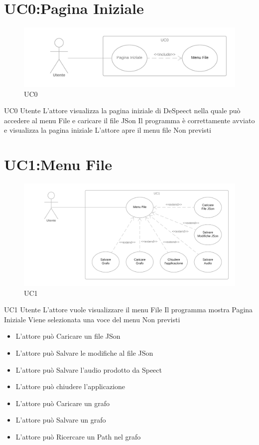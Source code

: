 \documentclass[../AnalisideiRequisiti.tex]{subfiles}
\begin{document}
	\section{UC0:Pagina Iniziale}
	\begin{figure}[H]
		\caption{UC0}
		\centering
		\includegraphics[width=\textwidth]{../img/UC00.png}
	\end{figure}
	\UserCase
	{UC0}
	{Utente}
	{}
	{L'attore visualizza la pagina iniziale di DeSpeect nella quale può accedere al menu File e caricare il file JSon}
	{Il programma è correttamente avviato e visualizza la pagina iniziale}
	{L'attore apre il menu file}
	{Non previsti}
	{}
	\section{UC1:Menu File}
	\begin{figure}[H]
	\caption{UC1}
	\centering
	\includegraphics[width=\textwidth]{../img/UC01.png}
	\end{figure}
	\UserCase
	{UC1}
	{Utente}
	{}
	{L'attore vuole visualizzare il menu File}
	{Il programma mostra Pagina Iniziale }
	{Viene selezionata una voce del menu}
	{Non previsti}
	{	\begin{itemize}
		\item{} L'attore può Caricare un file JSon 
		\item{} L'attore può Salvare le modifiche al file JSon 
		\item{} L'attore può Salvare l'audio prodotto da Speect 
		\item{} L'attore può chiudere l'applicazione 
		\item{} L'attore può Caricare un grafo 
		\item{} L'attore può Salvare un grafo 
		\item{} L'attore può Ricercare un Path nel grafo 
		\end{itemize}
	}
\end{document}

